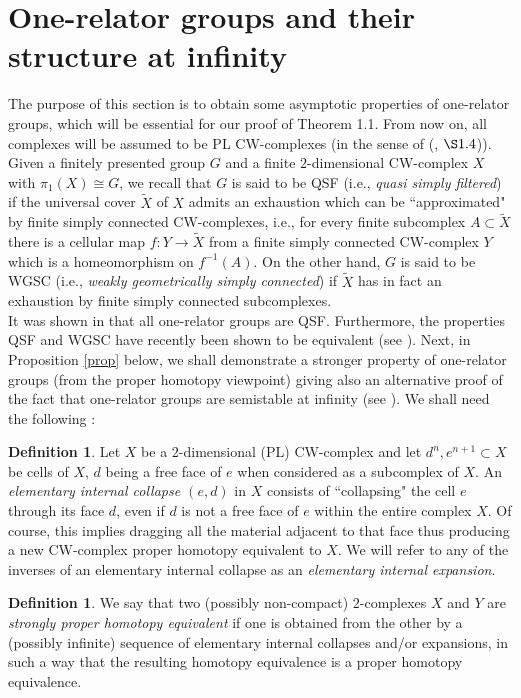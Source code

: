 \documentclass{amsart}[12pt]
\theoremstyle{definition}
\newtheorem{definition}[theorem]{Definition}
\theoremstyle{remark}
\numberwithin{equation}{section}
\begin{document}
\section{One-relator groups and their structure at infinity}
The purpose of this section is to obtain some asymptotic
properties of one-relator groups, which will be essential for our
proof of Theorem 1.1. From now on, all complexes will be assumed
to be PL
CW-complexes (in the sense of (\cite{HMS}, $\S 1.4$)).\\
\indent Given a finitely presented group $G$ and a finite
$2$-dimensional CW-complex $X$ with $\pi_1(X) \cong G$, we recall
that $G$ is said to be QSF (i.e., {\it quasi simply filtered}) if
the universal cover $\tilde{X}$ of $X$ admits an exhaustion which
can be ``approximated" by finite simply connected CW-complexes,
i.e., for every finite subcomplex $A {\subset} \tilde{X}$ there is a
cellular map $f : Y {\longrightarrow} \tilde{X}$ from a finite simply connected
CW-complex $Y$ which is a homeomorphism on $f^{-1}(A)$. On the
other hand, $G$ is said to be WGSC (i.e., {\it weakly
geometrically simply connected}) if $\tilde{X}$ has in
fact an exhaustion by finite simply connected subcomplexes.\\
\indent It was shown in \cite{BM} that all one-relator groups are
QSF. Furthermore, the properties QSF and WGSC have recently been
shown to be equivalent (see \cite{FG,FO}). Next, in Proposition
\ref{prop} below, we shall demonstrate a stronger property of
one-relator groups (from the proper homotopy viewpoint) giving
also an alternative proof of the fact that one-relator groups are
semistable at infinity (see \cite{MT}). We shall need the
following :
\begin{definition} Let $X$ be a $2$-dimensional (PL) CW-complex and let
$d^n, e^{n+1} {\subset} X$ be cells of $X$, $d$ being a free face of
$e$ when considered as a subcomplex of $X$. An {\it elementary
internal collapse $(e,d)$} in $X$ consists of ``collapsing" the
cell $e$ through its face $d$, even if $d$ is not a free face of
$e$ within the entire complex $X$. Of course, this implies
dragging all the material adjacent to that face thus producing a
new CW-complex proper homotopy equivalent to $X$. We will refer to
any of the inverses of an elementary internal collapse as an {\it
elementary internal expansion}.
\end{definition}
\begin{definition} We say that two (possibly non-compact) $2$-complexes $X$ and $Y$
are {\it strongly proper homotopy equivalent} if one is obtained
from the other by a (possibly infinite) sequence of elementary
internal collapses and/or expansions, in such a way that the
resulting homotopy equivalence is a proper homotopy equivalence.
\end{definition}
\end{document}
